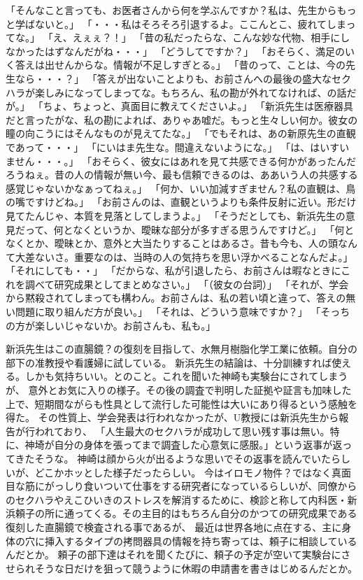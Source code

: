 「そんなこと言っても、お医者さんから何を学ぶんですか？私は、先生からもっと学ばないと。」
「・・・私はそろそろ引退するよ。ここんとこ、疲れてしまってな。」
「え、えぇぇ？！」
「昔の私だったらな、こんな妙な代物、相手にしなかったはずなんだがね・・・」
「どうしてですか？」
「おそらく、満足のいく答えは出せんからな。情報が不足しすぎとる。」
「昔のって、ことは、今の先生なら・・・？」
「答えが出ないことよりも、お前さんへの最後の盛大なセクハラが楽しみになってしまってな。もちろん、私の勘が外れてなければ、の話だが。」
「ちょ、ちょっと、真面目に教えてくださいよ。」
「新浜先生は医療器具だと言ったがな、私の勘によれば、ありゃあ嘘だ。もっと生々しい何か。彼女の瞳の向こうにはそんなものが見えてたな。」
「でもそれは、あの新原先生の直観であって・・・」
「にいはま先生な。間違えないようにな。」
「は、はいすいません・・・。」
「おそらく、彼女にはあれを見て共感できる何かがあったんだろうねぇ。昔の人の情報が無い今、最も信頼できるのは、ああいう人の共感する感覚じゃないかなぁってねぇ。」
「何か、いい加減すぎません？私の直観は、鳥の嘴ですけどね。」
「お前さんのは、直観というよりも条件反射に近い。形だけ見てたんじゃ、本質を見落としてしまうよ。」
「そうだとしても、新浜先生の意見だって、何となくというか、曖昧な部分が多すぎる思うんですけど。」
「何となくとか、曖昧とか、意外と大当たりすることはあるさ。昔も今も、人の頭なんて大差ないさ。重要なのは、当時の人の気持ちを思い浮かべることなんだよ。」
「それにしても・・」
「だからな、私が引退したら、お前さんは暇なときにこれを調べて研究成果としてまとめなさい。」
「（彼女の台詞）」
「それが、学会から黙殺されてしまっても構わん。お前さんは、私の若い頃と違って、答えの無い問題に取り組んだ方が良い。」
「それは、どういう意味ですか？」
「そっちの方が楽しいじゃないか。お前さんも、私も。」


新浜先生はこの直腸鏡？の復刻を目指して、水無月樹脂化学工業に依頼。自分の部下の准教授や看護婦に試している。
新浜先生の結論は、十分訓練すれば使える。しかも気持ちいい。とのこと。これを聞いた神崎も実験台にされてしまうが、
意外とお気に入りの様子。その後の調査で判明した証拠や証言も加味した上で、短期間ながらも性具として流行した可能性は大いにあり得るという感触を得た。
その性質上、学会発表は行われなかったが、U教授には新浜先生から報告が行われており、
「人生最大のセクハラが成功して思い残す事は無い。特に、神埼が自分の身体を張ってまで調査した心意気に感服。」という返事が返ってきたそうな。
神崎は顔から火が出るような思いでその返事を読んでいたらしいが、どこかホッとした様子だったらしい。
今はイロモノ物件？ではなく真面目な筋にがっしり食いついて仕事をする研究者になっているらしいが、同僚からのセクハラやえこひいきのストレスを解消するために、検診と称して内科医・新浜頼子の所に通ってくる。その主目的はもちろん自分のかつての研究成果である復刻した直腸鏡で検査される事であるが、
最近は世界各地に点在する、主に身体の穴に挿入するタイプの拷問器具の情報を持ち寄っては、頼子に相談しているんだとか。
頼子の部下達はそれを聞くたびに、頼子の予定が空いて実験台にさせられそうな日だけを狙って競うように休暇の申請書を書きはじめるんだとか。

